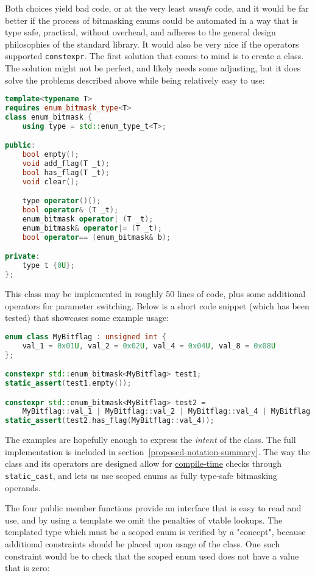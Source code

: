 \documentclass[
  format=manuscript,
  screen=true,
  review=false,
  nonacm=true,
  timestamp=true,
  balance=false]{acmart}
\newcommand{\beforecodespace}{\vspace{4mm}}
\begin{document}
\noindent
Both choices yield bad code, or at the very least \textit{unsafe} code, and it would
be far better if the process of bitmasking enums could be automated in a way that
is type safe, practical, without overhead, and adheres to the general design
philosophies of the standard library. It would also be very nice if the operators
supported \texttt{constexpr}. The first solution that comes to mind is to create
a class. The solution might not be perfect, and likely needs some adjusting, but
it does solve the problems described above while being relatively easy to use:

\beforecodespace\begin{lstlisting}[language=Cpp]
template<typename T>
requires enum_bitmask_type<T>
class enum_bitmask {
    using type = std::enum_type_t<T>;

public:
    bool empty();
    void add_flag(T _t);
    bool has_flag(T _t);
    void clear();

    type operator()();
    bool operator& (T _t);
    enum_bitmask operator| (T _t);
    enum_bitmask& operator|= (T _t);
    bool operator== (enum_bitmask& b);

private:
    type t {0U};
};
\end{lstlisting}

This class may be implemented in roughly 50 lines of code, plus some additional
operators for parameter switching. Below is a short code snippet (which has been
tested) that showcases some example usage:

\beforecodespace\begin{lstlisting}[language=Cpp]
enum class MyBitflag : unsigned int {
    val_1 = 0x01U, val_2 = 0x02U, val_4 = 0x04U, val_8 = 0x08U
};

constexpr std::enum_bitmask<MyBitflag> test1;
static_assert(test1.empty());

constexpr std::enum_bitmask<MyBitflag> test2 =
    MyBitflag::val_1 | MyBitflag::val_2 | MyBitflag::val_4 | MyBitflag::val_8;
static_assert(test2.has_flag(MyBitflag::val_4));
\end{lstlisting}


\noindent
The examples are hopefully enough to express the \textit{intent} of the class.
The full implementation is included in section~\ref{proposed-notation-summary}.
The way the class and its operators are designed allow for \underline{compile-time}
checks through \texttt{static\_cast}, and lets us use scoped enums as fully type-safe
bitmasking operands.

The four public member functions
provide an interface that is easy to read and use, and by using a template we omit
the penalties of vtable lookups. The templated type which must be a scoped enum is
verified by a "concept", because additional constraints should be placed upon usage
of the class. One such constraint would be to check that the scoped enum used does
not have a value that is zero:
\end{document}
